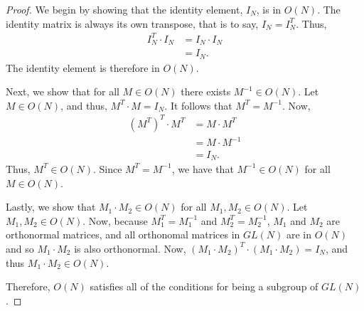 \documentclass[12pt]{article}
\begin{document}
\begin{proof}
    We begin by showing that the identity element, \(I_N\), is in \(O(N)\). The identity matrix is always its own transpose, that is to say, \(I_N = I_N^T\). Thus, 
    \begin{equation*}
        \begin{split}
            I_N^T \cdot I_N &= I_N\cdot I_N \\ &= I_N.
        \end{split}
    \end{equation*}
    The identity element is therefore in \(O(N)\). 

    Next, we show that for all \(M\in O(N)\) there exists \(M^{-1}\in O(N)\). Let \(M\in O(N)\), and thus, \(M^T\cdot M = I_N\). It follows that \(M^T = M^{-1}\). Now,
    \begin{equation*}
        \begin{split}
            (M^T)^T\cdot M^T &= M\cdot M^T\\
            &= M \cdot M^{-1}\\
            &= I_N.
        \end{split}
    \end{equation*}
    Thus, \(M^T\in O(N)\). Since \(M^T = M^{-1}\), we have that \(M^{-1}\in O(N)\) for all \(M\in O(N)\).

    Lastly, we show that \(M_1 \cdot M_2 \in O(N)\) for all \(M_1, M_2\in O(N)\). Let \(M_1, M_2 \in O(N)\). Now, because \(M_1^T = M_1^{-1}\) and \(M_2^T = M_2^{-1}\), \(M_1\) and \(M_2\) are orthonormal matrices, and all orthonomal matrices in \(GL(N)\) are in \(O(N)\) and so \(M_1 \cdot M_2\) is also orthonormal. Now, \((M_1 \cdot M_2)^T \cdot (M_1 \cdot M_2) = I_N\), and thus \(M_1 \cdot M_2\in O(N)\).
    
    Therefore, \(O(N)\) satisfies all of the conditions for being a subgroup of \(GL(N)\).
\end{proof}
\end{document}

